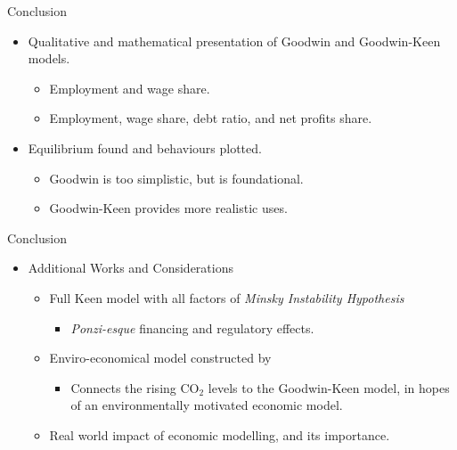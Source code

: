 \documentclass{beamer}
\begin{document}
\begin{frame}{Conclusion}
    \begin{itemize}
        \setlength\itemsep{2em}
        \item Qualitative and mathematical presentation of Goodwin and Goodwin-Keen models.
        \begin{itemize}
            \item Employment and wage share.
            \item Employment, wage share, debt ratio, and net profits share.
        \end{itemize}
        \item Equilibrium found and behaviours plotted.
        \begin{itemize}
            \item Goodwin is too simplistic, but is foundational.
            \item Goodwin-Keen provides more realistic uses.
        \end{itemize}
    \end{itemize}
\end{frame}
\begin{frame}{Conclusion}
    \begin{itemize}
        \item Additional Works and Considerations
        \begin{itemize}
            \setlength\itemsep{2em}
            \item Full Keen model with all factors of \emph{Minsky Instability Hypothesis}
            \begin{itemize}
                \item \textit{Ponzi-esque} financing and regulatory effects.
            \end{itemize}
            \item Enviro-economical model constructed by \citet{p9}
            \begin{itemize}
                \item Connects the rising CO$_2$ levels to the Goodwin-Keen model, in hopes of an environmentally motivated economic model.
            \end{itemize}
            \item Real world impact of economic modelling, and its importance.
        \end{itemize}
    \end{itemize}
\end{frame}
\end{document}
